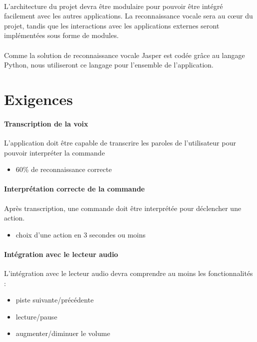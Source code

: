 \documentclass[12pt]{article}
\begin{document}
\paragraph{}
L'architecture du projet devra être modulaire pour pouvoir être intégré
facilement avec les autres applications. La reconnaissance vocale sera au
cœur du projet, tandis que les interactions avec les applications externes
seront implémentées sous forme de modules.

\paragraph{}
Comme la solution de reconnaissance vocale Jasper est codée grâce au langage
Python, nous utiliseront ce langage pour l'ensemble de l'application.

    \section{Exigences}

\paragraph{Transcription de la voix\\}
L'application doit être capable de transcrire
les paroles de l'utilisateur pour pouvoir interpréter la
commande
\begin{itemize}
    \item 60\% de reconnaissance correcte
\end{itemize}

\paragraph{Interprétation correcte de la commande\\}
Après transcription, une commande doit être interprétée pour déclencher une
action.
\begin{itemize}
    \item choix d'une action en 3 secondes ou moins
\end{itemize}

\paragraph{Intégration avec le lecteur audio\\}
L'intégration avec le lecteur audio devra comprendre au moins les
fonctionnalités :
\begin{itemize}
    \item piste suivante/précédente
    \item lecture/pause
    \item augmenter/diminuer le volume
\end{itemize}
\end{document}
